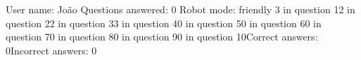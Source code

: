 User name: João
Questions answered: 0
Robot mode: friendly
3 in question 12 in question 22 in question 33 in question 40 in question 50 in question 60 in question 70 in question 80 in question 90 in question 10Correct answers: 0Incorrect answers: 0